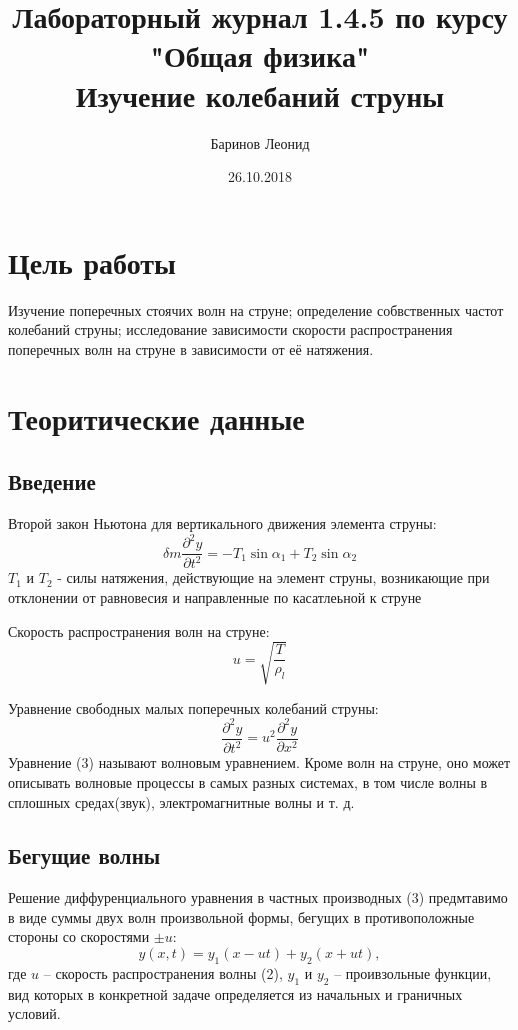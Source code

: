 \documentclass[a4paper,12pt]{article} %
\title{Лабораторный журнал 1.4.5 по курсу \\ "Общая физика"  \\ 
\vspace{0.2cm}
\vspace{4.5cm}
 \LARGE{\textbf{Изучение колебаний струны}}\vspace{5.5cm}}
\date{26.10.2018}
\author{\vspace{0.2cm}Баринов Леонид}
\begin{document}
\maketitle
\newpage
\section{Цель работы} Изучение поперечных стоячих волн на струне; определение собвственных частот колебаний струны; исследование зависимости скорости распространения поперечных волн на струне в зависимости от её натяжения.

\section{Теоритические данные}
\subsection{Введение}
Второй закон Ньютона для вертикального движения элемента струны:
\begin{equation}
\delta m \frac{\partial^2 y}{\partial t^2} = -T_1\sin\alpha_1 + T_2\sin\alpha_2
\end{equation}
$T_1$ и $T_2$ - силы натяжения, действующие на элемент струны, возникающие при отклонении от равновесия и направленные по касатлеьной к струне

Скорость распространения волн на струне:
\begin{equation}
u = \sqrt{\frac{T}{\rho_l}}
\end{equation}

Уравнение свободных малых поперечных колебаний струны: 
\begin{equation}
\frac{\partial^2 y}{\partial t^2} = u^2\frac{\partial^2 y}{\partial x^2}
\end{equation}
Уравнение (3) называют волновым уравнением. Кроме волн на струне, оно может описывать волновые процессы в самых разных системах, в том числе волны в сплошных средах(звук), электромагнитные волны и т. д.
\subsection{Бегущие волны}
Решение диффуренциального уравнения в частных производных (3) предмтавимо в виде суммы двух волн произвольной формы, бегущих в противоположные стороны со скоростями $\pm u$:
\begin{equation}
y(x, t) = y_1(x-ut)+y_2(x+ut),
\end{equation}
где $u$ -- скорость распространения волны (2), $y_1$ и $y_2$ -- проивзольные функции, вид которых в конкретной задаче определяется из начальных и граничных условий.
\end{document}
